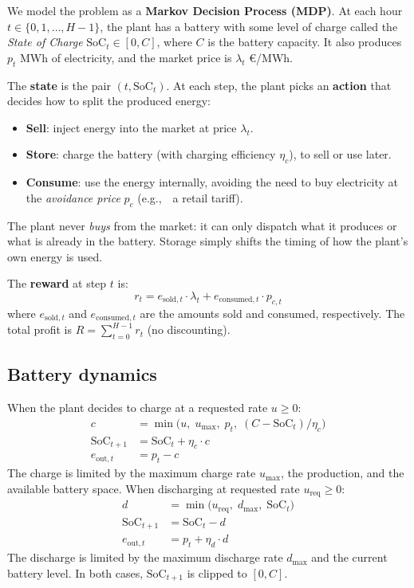 \documentclass[12pt,a4paper]{article}
\newcommand{\soc}{\mathrm{SoC}}
\newcommand{\eg}{e.g.,\ }
\begin{document}
We model the problem as a \textbf{Markov Decision Process (MDP)}. At each
hour $t \in \{0, 1, \dots, H-1\}$, the plant has a battery with some level of
charge called the \emph{State of Charge} $\soc_t \in [0, C]$, where $C$ is
the battery capacity. It also produces $p_t$ MWh of electricity, and the
market price is $\lambda_t$ \euro/MWh.

The \textbf{state} is the pair $(t, \soc_t)$. At each step, the plant picks
an \textbf{action} that decides how to split the produced energy:

\begin{itemize}
  \item \textbf{Sell}: inject energy into the market at price $\lambda_t$.
  \item \textbf{Store}: charge the battery (with charging efficiency
    $\eta_c$), to sell or use later.
  \item \textbf{Consume}: use the energy internally, avoiding the need to buy
    electricity at the \emph{avoidance price} $p_c$ (\eg\ a retail tariff).
\end{itemize}

The plant never \emph{buys} from the market: it can only dispatch what it
produces or what is already in the battery. Storage simply shifts the timing
of how the plant's own energy is used.

The \textbf{reward} at step $t$ is:
\begin{equation}
  r_t = e_{\mathrm{sold},t} \cdot \lambda_t
      + e_{\mathrm{consumed},t} \cdot p_{c,t}
\end{equation}
where $e_{\mathrm{sold},t}$ and $e_{\mathrm{consumed},t}$ are the amounts
sold and consumed, respectively. The total profit is
$R = \sum_{t=0}^{H-1} r_t$ (no discounting).

\subsection{Battery dynamics}

When the plant decides to charge at a requested rate $u \geq 0$:
\begin{align}
  c &= \min\!\bigl(u,\; u_{\max},\; p_t,\; (C - \soc_t)/\eta_c\bigr) \\
  \soc_{t+1} &= \soc_t + \eta_c \cdot c \\
  e_{\mathrm{out},t} &= p_t - c
\end{align}
The charge is limited by the maximum charge rate $u_{\max}$, the production,
and the available battery space. When discharging at requested rate
$u_{\mathrm{req}} \geq 0$:
\begin{align}
  d &= \min\!\bigl(u_{\mathrm{req}},\; d_{\max},\; \soc_t\bigr) \\
  \soc_{t+1} &= \soc_t - d \\
  e_{\mathrm{out},t} &= p_t + \eta_d \cdot d
\end{align}
The discharge is limited by the maximum discharge rate $d_{\max}$ and the
current battery level. In both cases, $\soc_{t+1}$ is clipped to $[0, C]$.
\end{document}
